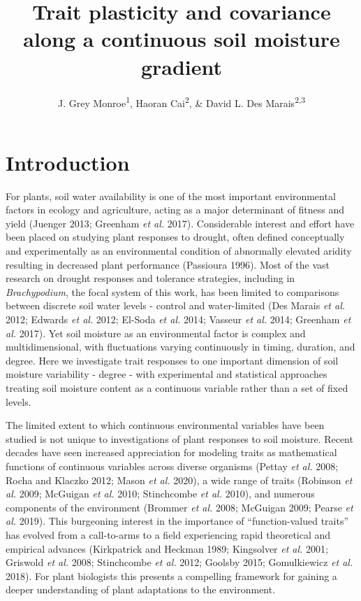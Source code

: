 \documentclass[jou,floatsintext]{apa6}
\title{Trait plasticity and covariance along a continuous soil moisture gradient}
\author{J. Grey Monroe\textsuperscript{1}, Haoran Cai\textsuperscript{2}, \& David L. Des Marais\textsuperscript{2,3}}
\date{}
\affiliation{
\vspace{0.5cm}
\textsuperscript{1} Department of Plant Sciences, University of California at Davis, Davis, USA\\\textsuperscript{2} Department of Civil and Environmental Engineering, Massachusetts Institute of Technology, Cambridge, MA, USA\\\textsuperscript{3} The Arnold Arboretum of Harvard University. Boston, MA, USA}
\begin{document}
\maketitle

\hypertarget{introduction}{%
\section{Introduction}\label{introduction}}

For plants, soil water availability is one of the most important environmental factors in ecology and agriculture, acting as a major determinant of fitness and yield (Juenger 2013; Greenham \emph{et al.} 2017). Considerable interest and effort have been placed on studying plant responses to drought, often defined conceptually and experimentally as an environmental condition of abnormally elevated aridity resulting in decreased plant performance (Passioura 1996). Most of the vast research on drought responses and tolerance strategies, including in \emph{Brachypodium}, the focal system of this work, has been limited to comparisons between discrete soil water levels - control and water-limited (Des Marais \emph{et al.} 2012; Edwards \emph{et al.} 2012; El-Soda \emph{et al.} 2014; Vasseur \emph{et al.} 2014; Greenham \emph{et al.} 2017). Yet soil moisture as an environmental factor is complex and multidimensional, with fluctuations varying continuously in timing, duration, and degree. Here we investigate trait responses to one important dimension of soil moisture variability - degree - with experimental and statistical approaches treating soil moisture content as a continuous variable rather than a set of fixed levels.

The limited extent to which continuous environmental variables have been studied is not unique to investigations of plant responses to soil moisture. Recent decades have seen increased appreciation for modeling traits as mathematical functions of continuous variables across diverse organisms (Pettay \emph{et al.} 2008; Rocha and Klaczko 2012; Mason \emph{et al.} 2020), a wide range of traits (Robinson \emph{et al.} 2009; McGuigan \emph{et al.} 2010; Stinchcombe \emph{et al.} 2010), and numerous components of the environment (Brommer \emph{et al.} 2008; McGuigan 2009; Pearse \emph{et al.} 2019). This burgeoning interest in the importance of \enquote{function-valued traits} has evolved from a call-to-arms to a field experiencing rapid theoretical and empirical advances (Kirkpatrick and Heckman 1989; Kingsolver \emph{et al.} 2001; Griswold \emph{et al.} 2008; Stinchcombe \emph{et al.} 2012; Goolsby 2015; Gomulkiewicz \emph{et al.} 2018). For plant biologists this presents a compelling framework for gaining a deeper understanding of plant adaptations to the environment.
\end{document}
